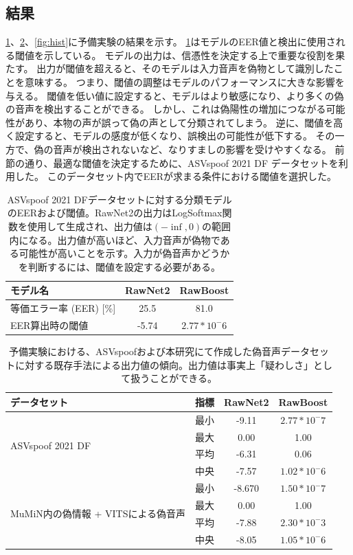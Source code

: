 \subsection{結果}
\cref{tab:eer}、\cref{tab:preOut}、\cref{fig:hist}に予備実験の結果を示す。
\cref{tab:eer}はモデルのEER値と検出に使用される閾値を示している。
モデルの出力は、信憑性を決定する上で重要な役割を果たす。
出力が閾値を超えると、そのモデルは入力音声を偽物として識別したことを意味する。
つまり、閾値の調整はモデルのパフォーマンスに大きな影響を与える。
閾値を低い値に設定すると、モデルはより敏感になり、より多くの偽の音声を検出することができる。
しかし、これは偽陽性の増加につながる可能性があり、本物の声が誤って偽の声として分類されてしまう。
逆に、閾値を高く設定すると、モデルの感度が低くなり、誤検出の可能性が低下する。
その一方で、偽の音声が検出されないなど、なりすましの影響を受けやすくなる。
前節の通り、最適な閾値を決定するために、ASVspoof 2021 DF データセットを利用した。
このデータセット内でEERが求まる条件における閾値を選択した。

\begin{table}[h]
    \centering
    \begin{tabular}{lcc}\hline
        モデル名 & RawNet2 & RawBoost \\ \hline \hline
        等価エラー率 (EER) [\%] & 25.5 & 81.0 \\
        EER算出時の閾値 & -5.74 & $2.77 * 10^-6$ \\ \hline
    \end{tabular}
    \caption{ASVspoof 2021 DFデータセットに対する分類モデルのEERおよび閾値。RawNet2の出力はLogSoftmax関数を使用して生成され、出力値は$(-\inf,0)$の範囲内になる。出力値が高いほど、入力音声が偽物である可能性が高いことを示す。入力が偽音声かどうかを判断するには、閾値を設定する必要がある。}
    \label{tab:eer}
\end{table}

\begin{table}[h]
    \centering
    \begin{tabular}{lccc} \hline
        データセット & 指標 & RawNet2 & RawBoost \\\hline \hline
         & 最小 & -9.11 & $2.77 * 10^-7$ \\
        \multirow{2}{*}{ASVspoof 2021 DF} & 最大 & 0.00 & 1.00 \\
         & 平均 & -6.31 & 0.06 \\
         & 中央 & -7.57 & $1.02 * 10^-6$ \\ \hline
         & 最小 & -8.670 & $1.50 * 10^-7$ \\
         \multirow{2}{*}{MuMiN内の偽情報 + VITSによる偽音声}& 最大 & 0.00 & 1.00 \\
         & 平均 & -7.88 & $2.30 * 10^-3$ \\
         & 中央 & -8.05 & $1.05 * 10^-6$ \\ \hline
    \end{tabular}
    \caption{予備実験における、ASVspoofおよび本研究にて作成した偽音声データセットに対する既存手法による出力値の傾向。出力値は事実上「疑わしさ」として扱うことができる。}
    \label{tab:preOut}
\end{table}

